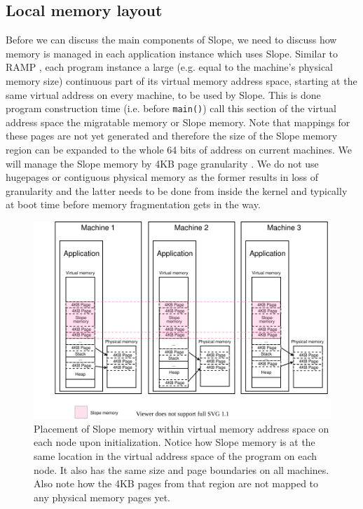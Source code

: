 \subsection{Local memory layout}
Before we can discuss the main components of Slope, we need to discuss how
memory is managed in each application instance which uses Slope. Similar to
RAMP \cite{memon2018ramp}, each program instance  a
large   (e.g. equal to the machine's physical memory size) continuous part
of its virtual memory address space, starting at the same virtual address
on every machine, to be used by Slope.
This is done  program construction
time (i.e. before \texttt{main()})  call this section of the virtual
address space the migratable memory or Slope memory. Note that mappings for
these pages are not yet generated and therefore the size of the Slope memory
region can be expanded to the whole 64 bits of address on current machines.
We will manage the Slope memory by 4KB page granularity .
We do not use 
hugepages or contiguous physical memory as the former results in
loss of granularity and the latter needs to be done from inside the kernel and
typically at boot time before memory fragmentation gets in the way.

\begin{figure}[t]
\centering
{}
\includegraphics[width=1\textwidth]{local-memory-management-phys-log.drawio}
\caption{
    Placement of Slope memory within virtual memory address space on each node
    upon initialization.
    Notice how Slope memory is at the same location in the virtual address
    space of the program on each node. It also has the same size and
    page boundaries on all machines. Also note how
    the 4KB pages from that region are not mapped to any physical memory pages
    yet.
}
\label{fig:localmemorymanagementphyslog}
\end{figure}

